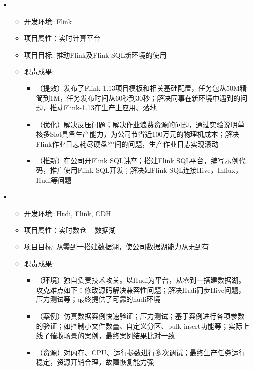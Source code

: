   \begin{itemize}[leftmargin=*]
    \item
      {\small
      \begin{itemize}
        \item 开发环境: Flink
        \item 项目属性：实时计算平台
        \item 项目目标: 推动Flink及Flink SQL新环境的使用
        \item 职责成果: 
        \begin{itemize}
          \item （提效）发布了Flink-1.13项目模板和相关基础配置，任务包从50M精简到1M，任务发布时间从60秒到30秒；解决同事在新环境中遇到的问题，推动Flink-1.13在生产上应用、落地
          \item （优化）解决反压问题；解决作业浪费资源的问题，通过实验说明单核多Slot具备生产能力，为公司节省近100万元的物理机成本；解决Flink作业日志耗尽硬盘空间的问题，生产作业日志实现滚动
          \item （推新）在公司开Flink SQL讲座；搭建Flink SQL平台，编写示例代码，推广使用Flink SQL开发；解决如Flink SQL连接Hive，Influx，Hudi等问题
        \end{itemize}
      \end{itemize}
      }
  \end{itemize}

  \begin{itemize}[leftmargin=*]
    \item
      {\small
      \begin{itemize}
        \item 开发环境: Hudi, Flink, CDH
        \item 项目属性：实时数仓 -- 数据湖
        \item 项目目标: 从零到一搭建数据湖，使公司数据湖能力从无到有
        \item 职责成果: 
        \begin{itemize}
          \item （环境）独自负责技术攻关。以Hudi为平台，从零到一搭建数据湖。攻克难点如下：修改源码解决兼容性问题；解决Hudi同步Hive问题，压力测试等；最终提供了可靠的hudi环境
          \item （案例）仿真数据案例快速验证；压力测试；基于案例进行各项参数的验证；如控制小文件数量、自定义分区、bulk-insert功能等；实际上线了催收场景的案例，最终案例结果比对一致
          \item （资源）对内存、CPU、运行参数进行多次调试；最终生产任务运行稳定，资源开销合理，故障恢复能力强
        \end{itemize}
      \end{itemize}
      }
  \end{itemize}

